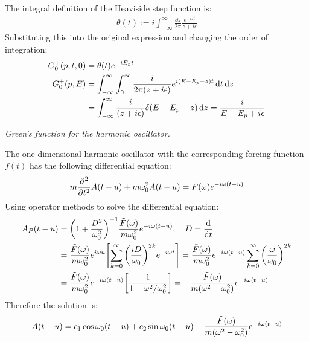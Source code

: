 \documentclass{report}
\begin{document}
\begin{subquests}
\begin{subquests}
		\item The integral definition of the Heaviside step function is:
		\begin{gather*}
			\theta(t) := i\int_{-\infty}^{\infty}\frac{\dd z}{2\pi}\frac{e^{-izt}}{z+i\epsilon}
		\end{gather*}
		Substituting this into the original expression and changing the order of integration:
		\begin{align*}
			G^+_0(p,t,0) & = \theta(t)e^{-iE_p t} \\
			G^+_0(p,E) & = \int_{-\infty}^{\infty}\int_{0}^{\infty}\frac{i}{2\pi\pqty{z+i\epsilon}}e^{i\pqty{E - E_p - z}t} \dd{t}\dd{z} \\
			& = \int_{-\infty}^{\infty}\frac{i}{\pqty{z+i\epsilon}}\delta{\pqty{E - E_p - z}} \dd{z} = \frac{i}{E - E_p + i\epsilon}
		\end{align*}
	\end{subquests}
	\newpage
	\item \emph{Green's function for the harmonic oscillator.}
	\begin{subquests}
		\item The one-dimensional harmonic oscillator with the corresponding forcing function $f(t)$ has the following differential equation:
		\begin{gather*}
			m\pdv[2]{t}A(t-u) + m\omega_0^2A(t-u) = \tilde F(\omega)e^{-i\omega(t-u)}
		\end{gather*}
		Using operator methods to solve the differential equation:
		\begin{align*}
			A_P(t-u) & = \pqty{1 + \frac{D^2}{\omega_0^2}}^{-1}\frac{\tilde F(\omega)}{m\omega_0^2}e^{-i\omega(t-u)}, \quad D = \dv{t} \\
			& = \frac{\tilde F(\omega)}{m\omega_0^2}e^{i\omega u}\bqty{\sum_{k=0}^{\infty} \pqty{\frac{iD}{\omega_0}}^{2k}e^{-i\omega t}} = \frac{\tilde F(\omega)}{m\omega_0^2}e^{-i\omega(t-u)}\sum_{k=0}^{\infty}\pqty{\frac{\omega}{\omega_0}}^{2k}\\
			& = \frac{\tilde F(\omega)}{m\omega_0^2}e^{-i\omega(t-u)}\bqty{\frac{1}{1-\omega^2/\omega_0^2}} = -\frac{\tilde F(\omega)}{m\pqty{\omega^2 - \omega_0^2}}e^{-i\omega(t-u)} 
		\end{align*}
		Therefore the solution is:
		\begin{gather*}
			A(t-u) = c_1 \cos\omega_0(t-u) + c_2 \sin\omega_0(t-u) - \frac{\tilde F(\omega)}{m\pqty{\omega^2 - \omega_0^2}}e^{-i\omega(t-u)} 
		\end{gather*}


\end{subquests}
\end{subquests}
\end{document}
